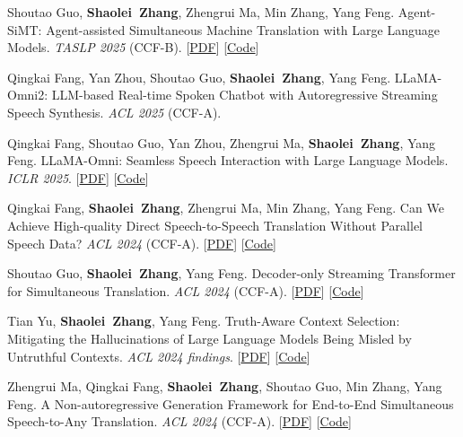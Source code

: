 \documentclass{resume}
\begin{document}
\begin{enumerate}[label={[\arabic*]},parsep=0ex]
    \item Shoutao Guo, \textbf{Shaolei\ Zhang}, Zhengrui Ma, Min Zhang, Yang Feng. Agent-SiMT: Agent-assisted Simultaneous Machine Translation with Large Language Models. \textit{TASLP 2025} \textcolor{red1}{(CCF-B)}. [\href{https://arxiv.org/pdf/2406.06910}{PDF}] [\href{https://github.com/ictnlp/SiLLM}{Code}]

    \item Qingkai Fang, Yan Zhou, Shoutao Guo, \textbf{Shaolei\ Zhang}, Yang Feng. LLaMA-Omni2: LLM-based Real-time Spoken Chatbot with Autoregressive Streaming Speech Synthesis. \textit{ACL 2025} (\textcolor{red2}{CCF-A}).

    \item Qingkai Fang, Shoutao Guo, Yan Zhou, Zhengrui Ma, \textbf{Shaolei\ Zhang}, Yang Feng. LLaMA-Omni: Seamless Speech Interaction with Large Language Models. \textit{ICLR 2025}. [\href{https://arxiv.org/pdf/2406.06910}{PDF}] [\href{https://github.com/ictnlp/SiLLM}{Code}]

      
    \item Qingkai Fang, \textbf{Shaolei\ Zhang}, Zhengrui Ma, Min Zhang, Yang Feng. Can We Achieve High-quality Direct Speech-to-Speech Translation Without Parallel Speech Data? \textit{ACL 2024} (\textcolor{red2}{CCF-A}). [\href{https://arxiv.org/pdf/2406.07289}{PDF}] [\href{https://github.com/ictnlp/ComSpeech}{Code}]
    
    \item Shoutao Guo, \textbf{Shaolei\ Zhang}, Yang Feng. Decoder-only Streaming Transformer for Simultaneous Translation. \textit{ACL 2024} (\textcolor{red2}{CCF-A}). [\href{https://arxiv.org/pdf/2406.03878}{PDF}] [\href{https://github.com/ictnlp/DST}{Code}] 

    \item Tian Yu, \textbf{Shaolei\ Zhang}, Yang Feng. Truth-Aware Context Selection: Mitigating the Hallucinations of Large Language Models Being Misled by Untruthful Contexts. \textit{ACL 2024 findings}. [\href{https://arxiv.org/pdf/2403.07556.pdf}{PDF}] [\href{https://github.com/ictnlp/TACS}{Code}]
      
    \item Zhengrui Ma, Qingkai Fang, \textbf{Shaolei\ Zhang}, Shoutao Guo, Min Zhang, Yang Feng. A Non-autoregressive Generation Framework for End-to-End Simultaneous Speech-to-Any Translation. \textit{ACL 2024} (\textcolor{red2}{CCF-A}). [\href{https://arxiv.org/pdf/2406.06937}{PDF}] [\href{https://github.com/ictnlp/NAST-S2x}{Code}] 
      

\end{enumerate}
\end{document}
